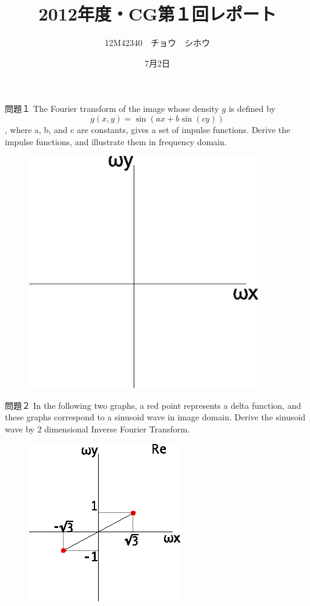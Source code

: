 \documentclass[a4paper,11pt]{jsarticle}
\title{2012年度・CG第１回レポート}
\author{12M42340　チョウ　シホウ}
\date{7月2日}
\numberwithin{theorem}{section}  %
\numberwithin{equation}{section} %
\begin{document}
{}
\renewcommand{\thepart}{\arabic{part}}


\begin{itembox}[l]{問題１}
The Fourier transform of the image whose density $g$ is defined by
\[g(x, y) = \sin(ax + b \sin(cy))\],
where a, b, and c are constants, gives a set of impulse functions. Derive the impulse functions, and illustrate them in frequency domain.
\end{itembox}
\begin{figure}[H]
\includegraphics[bb=0 0 444 451,width=10cm]{img1.pdf}
\end{figure}
\newpage
\begin{itembox}[l]{問題２}
In the following two graphs, a red point represents a delta function, and these graphs correspond to a sinusoid wave in image domain. Derive the sinusoid wave by 2 dimensional Inverse Fourier Transform.
\end{itembox}
\begin{figure}[H]
\includegraphics[bb=0 0 250 260]{img2.png}
\end{figure}
\end{document}
